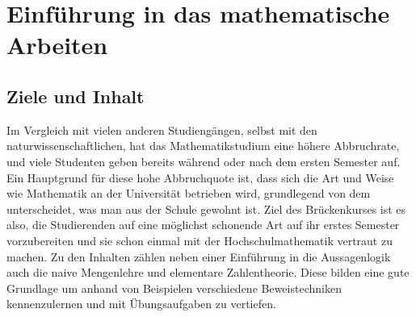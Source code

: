 \chapter{Einführung in das mathematische Arbeiten}
\section{Ziele und Inhalt}
Im Vergleich mit vielen anderen Studiengängen, selbst mit den
naturwissenschaftlichen, hat das Mathematikstudium eine höhere Abbruchrate,
und viele Studenten geben bereits während oder nach dem ersten Semester auf.
Ein Hauptgrund für diese hohe Abbruchquote ist, dass sich die Art und Weise wie
Mathematik an der Universität betrieben wird, grundlegend von dem unterscheidet,
was man aus der Schule gewohnt ist.
Ziel des Brückenkurses ist es also, die Studierenden auf eine möglichst schonende
Art auf ihr erstes Semester vorzubereiten und sie schon einmal mit der
Hochschulmathematik vertraut zu machen.
Zu den Inhalten zählen neben einer Einführung in die Aussagenlogik auch die
naive Mengenlehre und elementare Zahlentheorie.
Diese bilden eine gute Grundlage um anhand von Beispielen verschiedene
Beweistechniken kennenzulernen und mit Übungsaufgaben zu vertiefen.

